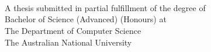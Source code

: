 
\begin{titlepage}
  \enlargethispage{2cm}
  \begin{center}
    \makeatletter
    \Huge\textbf{\@title} \\[.4cm]
    \Huge\textbf{\thesisqualifier} \\[2.5cm]
    \huge\textbf{\@author} \\[8.5cm]
    \makeatother
    \Large A thesis submitted in partial fulfillment of the degree of \\
    \LARGE Bachelor of Science (Advanced) (Honours) at \\
    The Department of Computer Science\\
    The Australian National University \\[2cm]
    \thismonth
  \end{center}
\end{titlepage}

